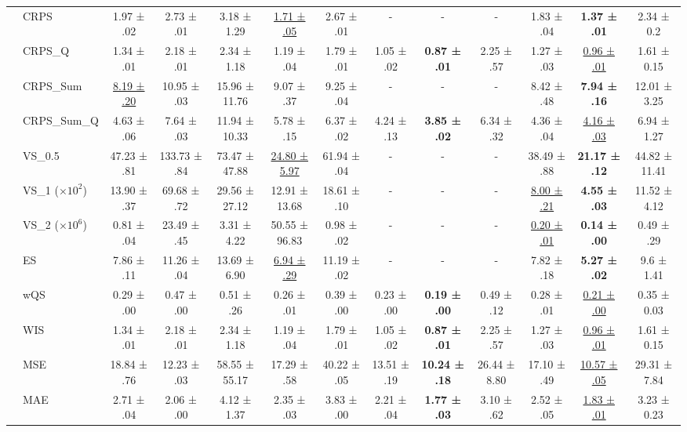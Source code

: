 \documentclass[a4paper,oneside,bibliography=totoc]{scrbook}
\begin{document}
\begin{sidewaystable}[htbp]
\begin{adjustbox}{center}
{\begin{tabular}{ll*{11}{c}}
& CRPS   & 1.97 ± .02 & 2.73 ± .01 & 3.18 ± 1.29 & \underline{1.71 ± .05} & 2.67 ± .01 & - & - & - & 1.83 ± .04 & \textbf{1.37 ± .01} & 2.34 ± 0.2 \\
& CRPS\_Q  & 1.34 ± .01 & 2.18 ± .01 & 2.34 ± 1.18 & 1.19 ± .04 & 1.79 ± .01 & 1.05 ± .02 & \textbf{0.87 ± .01} & 2.25 ± .57 & 1.27 ± .03 & \underline{0.96 ± .01} & 1.61 ± 0.15 \\
& CRPS\_Sum  & \underline{8.19 ± .20} & 10.95 ± .03 & 15.96 ± 11.76 & 9.07 ± .37 & 9.25 ± .04 & - & - & - & 8.42 ± .48 & \textbf{7.94 ± .16} & 12.01 ± 3.25 \\
& CRPS\_Sum\_Q  & 4.63 ± .06 & 7.64 ± .03 & 11.94 ± 10.33 & 5.78 ± .15 & 6.37 ± .02 & 4.24 ± .13 & \textbf{3.85 ± .02} & 6.34 ± .32 & 4.36 ± .04 & \underline{4.16 ± .03} & 6.94 ± 1.27 \\
& VS\_0.5   & 47.23 ± .81 & 133.73 ± .84 & 73.47 ± 47.88 & \underline{24.80 ± 5.97} & 61.94 ± .04 & - & - & - & 38.49 ± .88 & \textbf{21.17 ± .12} & 44.82 ± 11.41 \\
& VS\_1 ($\times 10^{2}$)   & 13.90 ± .37 & 69.68 ± .72 & 29.56 ± 27.12 & 12.91 ± 13.68 & 18.61 ± .10 & - & - & - & \underline{8.00 ± .21} & \textbf{4.55 ± .03} & 11.52 ± 4.12 \\
& VS\_2 ($\times 10^{6}$)   & 0.81 ± .04 & 23.49 ± .45 & 3.31 ± 4.22 & 50.55 ± 96.83 & 0.98 ± .02 & - & - & - & \underline{0.20 ± .01} & \textbf{0.14 ± .00} & 0.49 ± .29 \\
& ES    & 7.86 ± .11 & 11.26 ± .04 & 13.69 ± 6.90 & \underline{6.94 ± .29} & 11.19 ± .02 & - & - & - & 7.82 ± .18 & \textbf{5.27 ± .02} & 9.6 ± 1.41 \\
& wQS    & 0.29 ± .00 & 0.47 ± .00 & 0.51 ± .26 & 0.26 ± .01 & 0.39 ± .00 & 0.23 ± .00 & \textbf{0.19 ± .00} & 0.49 ± .12 & 0.28 ± .01 & \underline{0.21 ± .00} & 0.35 ± 0.03 \\
& WIS    & 1.34 ± .01 & 2.18 ± .01 & 2.34 ± 1.18 & 1.19 ± .04 & 1.79 ± .01 & 1.05 ± .02 & \textbf{0.87 ± .01} & 2.25 ± .57 & 1.27 ± .03 & \underline{0.96 ± .01} & 1.61 ± 0.15 \\
& MSE    & 18.84 ± .76 & 12.23 ± .03 & 58.55 ± 55.17 & 17.29 ± .58 & 40.22 ± .05 & 13.51 ± .19 & \textbf{10.24 ± .18} & 26.44 ± 8.80 & 17.10 ± .49 & \underline{10.57 ± .05} & 29.31 ± 7.84 \\
& MAE    & 2.71 ± .04 & 2.06 ± .00 & 4.12 ± 1.37 & 2.35 ± .03 & 3.83 ± .00 & 2.21 ± .04 & \textbf{1.77 ± .03} & 3.10 ± .62 & 2.52 ± .05 & \underline{1.83 ± .01} & 3.23 ± 0.23 \\

\end{tabular}}
\end{adjustbox}
\end{sidewaystable}
\end{document}
